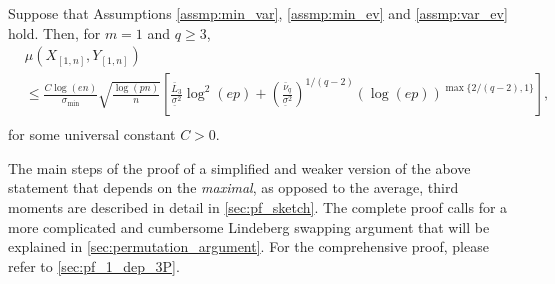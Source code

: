 \documentclass[aos]{imsart}
\begin{document}



\begin{theorem} \label{thm:1_dep_berry_esseen_3P}
Suppose that Assumptions \eqref{assmp:min_var}, \eqref{assmp:min_ev} and \eqref{assmp:var_ev} hold. Then, for $m=1$ and $q \geq 3$, 
\begin{equation*}
\begin{aligned}
    & \mu\left( X_{[1,n]}, Y_{[1,n]} \right) \\
    & \leq \frac{C \log(en)}{\sigma_{\min}} \sqrt{\frac{\log(pn)}{n}}  \left[
        \frac{\bar{L}_3}{\underline{\sigma}^2} \log^{2}(ep) 
        + \left( \frac{\bar\nu_q}{\underline\sigma^2} 
        \right)^{1/(q-2)} (\log(ep))^{\max\{2/(q-2),1\}}
    \right], \\
\end{aligned}
\end{equation*}
for some universal constant $C > 0$.
\end{theorem}


 
The main steps of the proof of a simplified and weaker version of the above statement that depends on the {\it maximal}, as opposed to the average, third moments are described in detail in \cref{sec:pf_sketch}. The complete proof calls for a more complicated and cumbersome Lindeberg swapping argument that will be explained in \cref{sec:permutation_argument}. For the comprehensive proof, please refer to \cref{sec:pf_1_dep_3P}.
\end{document}
